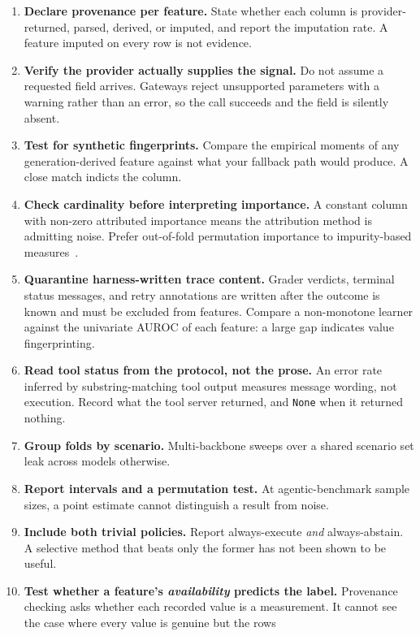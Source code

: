 \documentclass[conference]{IEEEtran}
\begin{document}
\begin{enumerate}
  \item \textbf{Declare provenance per feature.} State whether each column is
  provider-returned, parsed, derived, or imputed, and report the imputation
  rate. A feature imputed on every row is not evidence.
  \item \textbf{Verify the provider actually supplies the signal.} Do not assume
  a requested field arrives. Gateways reject unsupported parameters with a
  warning rather than an error, so the call succeeds and the field is silently
  absent.
  \item \textbf{Test for synthetic fingerprints.} Compare the empirical moments
  of any generation-derived feature against what your fallback path would
  produce. A close match indicts the column.
  \item \textbf{Check cardinality before interpreting importance.} A constant
  column with non-zero attributed importance means the attribution method is
  admitting noise. Prefer out-of-fold permutation importance to impurity-based
  measures~\cite{strobl}.
  \item \textbf{Quarantine harness-written trace content.} Grader verdicts,
  terminal status messages, and retry annotations are written after the outcome
  is known and must be excluded from features. Compare a non-monotone learner
  against the univariate AUROC of each feature: a large gap indicates value
  fingerprinting.
  \item \textbf{Read tool status from the protocol, not the prose.} An error
  rate inferred by substring-matching tool output measures message wording, not
  execution. Record what the tool server returned, and \texttt{None} when it
  returned nothing.
  \item \textbf{Group folds by scenario.} Multi-backbone sweeps over a shared
  scenario set leak across models otherwise.
  \item \textbf{Report intervals and a permutation test.} At agentic-benchmark
  sample sizes, a point estimate cannot distinguish a result from noise.
  \item \textbf{Include both trivial policies.} Report always-execute
  \emph{and} always-abstain. A selective method that beats only the former has
  not been shown to be useful.
  \item \textbf{Test whether a feature's \emph{availability} predicts the
  label.} Provenance checking asks whether each recorded value is a
  measurement. It cannot see the case where every value is genuine but the rows

\end{enumerate}
\end{document}
